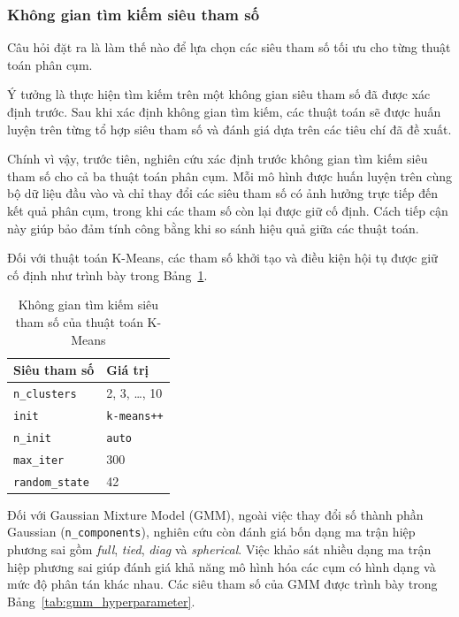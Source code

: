 \documentclass[12pt]{ai_conquer2026}
\begin{document}
\subsubsection{Không gian tìm kiếm siêu tham số}

Câu hỏi đặt ra là làm thế nào để lựa chọn các siêu tham số tối ưu cho từng thuật toán phân cụm. 

Ý tưởng là thực hiện tìm kiếm trên một không gian siêu tham số đã được xác định trước. Sau khi xác định không gian tìm kiếm, các thuật toán sẽ được huấn luyện trên từng tổ hợp siêu tham số và đánh giá dựa trên các tiêu chí đã đề xuất.

Chính vì vậy, trước tiên, nghiên cứu xác định trước không gian tìm kiếm siêu tham số cho cả ba thuật toán phân cụm. Mỗi mô hình được huấn luyện trên cùng bộ dữ liệu đầu vào và chỉ thay đổi các siêu tham số có ảnh hưởng trực tiếp đến kết quả phân cụm, trong khi các tham số còn lại được giữ cố định. Cách tiếp cận này giúp bảo đảm tính công bằng khi so sánh hiệu quả giữa các thuật toán.

Đối với thuật toán K-Means, các tham số khởi tạo và điều kiện hội tụ được giữ cố định như trình bày trong Bảng~\ref{tab:kmeans_hyperparameter}.

\begin{table}[H]
\centering
\caption{Không gian tìm kiếm siêu tham số của thuật toán K-Means}
\label{tab:kmeans_hyperparameter}
\renewcommand{\arraystretch}{1.3}
\begin{tabular}{ll}
\toprule
\textbf{Siêu tham số} & \textbf{Giá trị} \\
\midrule
\texttt{n\_clusters} & 2, 3, \ldots, 10 \\
\texttt{init} & \texttt{k-means++} \\
\texttt{n\_init} & \texttt{auto} \\
\texttt{max\_iter} & 300 \\
\texttt{random\_state} & 42 \\
\bottomrule
\end{tabular}
\end{table}

Đối với Gaussian Mixture Model (GMM), ngoài việc thay đổi số thành phần Gaussian (\texttt{n\_components}), nghiên cứu còn đánh giá bốn dạng ma trận hiệp phương sai gồm \textit{full}, \textit{tied}, \textit{diag} và \textit{spherical}. Việc khảo sát nhiều dạng ma trận hiệp phương sai giúp đánh giá khả năng mô hình hóa các cụm có hình dạng và mức độ phân tán khác nhau. Các siêu tham số của GMM được trình bày trong Bảng~\ref{tab:gmm_hyperparameter}.
\end{document}
